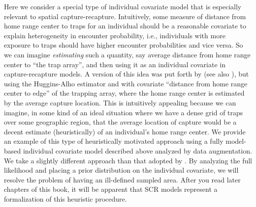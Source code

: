 Here we consider a special type of individual covariate model that is
especially relevant to spatial capture-recapture.  Intuitively, some
measure of distance from home range center to traps for an individual
should be a reasonable covariate to explain heterogeneity in encounter
probability, i.e., individuals with more exposure to traps should have
higher encounter probabilities and vice versa. So we can imagine {\it
  estimating} such a quantity, say average distance from home range
center to ``the trap array'', and then using it as an individual
covariate in capture-recapture models.  A version of this idea was put
forth by \citet{boulanger_mclellan:2001} (see also \citet{ivan:2012}),
but using the Huggins-Alho estimator and with covariate ``distance
from home range center to edge'' of the trapping array, where the home
range center is estimated by the average capture location.  This is
intuitively appealing because we can imagine, in some kind of an ideal
situation where we have a dense grid of traps over some geographic
region, that the average location of capture would be a decent
estimate (heuristically) of an individual's home range center.  We
provide an example of this type of heuristically motivated approach
using a fully model-based individual covariate model described above
analyzed by data augmentation. We take a slightly different approach
than that adopted by \citet{boulanger_mclellan:2001}. By analyzing the
full likelihood and placing a prior distribution on the individual
covariate, we will resolve the problem of having an ill-defined
sampled area.  After you read later chapters of this book, it will be
apparent that SCR models represent a formalization of this heuristic
procedure.





